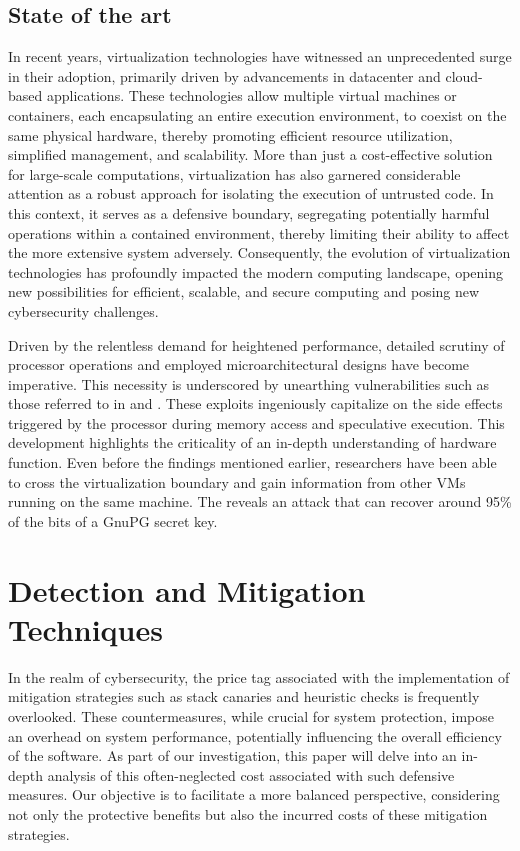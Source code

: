 \documentclass{article}
\begin{document}
\subsection{State of the art}

In recent years, virtualization technologies have witnessed an unprecedented surge in their adoption, primarily driven by advancements in datacenter and cloud-based applications. These technologies allow multiple virtual machines or containers, each encapsulating an entire execution environment, to coexist on the same physical hardware, thereby promoting efficient resource utilization, simplified management, and scalability. More than just a cost-effective solution for large-scale computations, virtualization has also garnered considerable attention as a robust approach for isolating the execution of untrusted code. In this context, it serves as a defensive boundary, segregating potentially harmful operations within a contained environment, thereby limiting their ability to affect the more extensive system adversely. Consequently, the evolution of virtualization technologies has profoundly impacted the modern computing landscape, opening new possibilities for efficient, scalable, and secure computing and posing new cybersecurity challenges.

Driven by the relentless demand for heightened performance, detailed scrutiny of processor operations and employed microarchitectural designs have become imperative. This necessity is underscored by unearthing vulnerabilities such as those referred to in \cite{spectre} and \cite{meltdown}. These exploits ingeniously capitalize on the side effects triggered by the processor during memory access and speculative execution. This development highlights the criticality of an in-depth understanding of hardware function. Even before the findings mentioned earlier, researchers have been able to cross the virtualization boundary and gain information from other VMs running on the same machine. The \cite{flushreload} reveals an attack that can recover around 95\% of the bits of a GnuPG secret key.

\section{Detection and Mitigation Techniques}%
In the realm of cybersecurity, the price tag associated with the implementation of mitigation strategies such as stack canaries and heuristic checks is frequently overlooked. These countermeasures, while crucial for system protection, impose an overhead on system performance, potentially influencing the overall efficiency of the software. As part of our investigation, this paper will delve into an in-depth analysis of this often-neglected cost associated with such defensive measures. Our objective is to facilitate a more balanced perspective, considering not only the protective benefits but also the incurred costs of these mitigation strategies.
\end{document}
